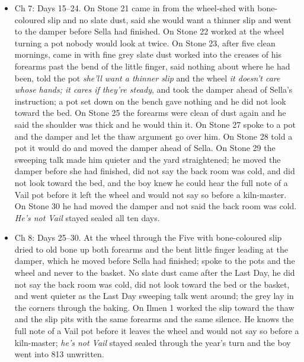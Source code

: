 \documentclass{design/chronicle}
\begin{document}
{\begin{itemize}[leftmargin=1.4em,itemsep=1pt,topsep=3pt,parsep=0pt]
\end{itemize}

\begin{itemize}[leftmargin=1.4em,itemsep=1pt,topsep=3pt,parsep=0pt]

\item Ch 7: Days 15--24. On Stone 21 came in from the wheel-shed with bone-coloured slip and no slate dust, said she would want a thinner slip and went to the damper before Sella had finished. On Stone 22 worked at the wheel turning a pot nobody would look at twice. On Stone 23, after five clean mornings, came in with fine grey slate dust worked into the creases of his forearms past the bend of the little finger, said nothing about where he had been, told the pot \emph{she’ll want a thinner slip} and the wheel \emph{it doesn’t care whose hands; it cares if they’re steady}, and took the damper ahead of Sella’s instruction; a pot set down on the bench gave nothing and he did not look toward the bed. On Stone 25 the forearms were clean of dust again and he said the shoulder was thick and he would thin it. On Stone 27 spoke to a pot and the damper and let the thaw argument go over him. On Stone 28 told a pot it would do and moved the damper ahead of Sella. On Stone 29 the sweeping talk made him quieter and the yard straightened; he moved the damper before she had finished, did not say the back room was cold, and did not look toward the bed, and the boy knew he could hear the full note of a Vail pot before it left the wheel and would not say so before a kiln-master. On Stone 30 he had moved the damper and not said the back room was cold. \emph{He’s not Vail} stayed sealed all ten days.

\end{itemize}

\begin{itemize}[leftmargin=1.4em,itemsep=1pt,topsep=3pt,parsep=0pt]

\item Ch 8: Days 25--30. At the wheel through the Five with bone-coloured slip dried to old bone up both forearms and the bent little finger leading at the damper, which he moved before Sella had finished; spoke to the pots and the wheel and never to the basket. No slate dust came after the Last Day, he did not say the back room was cold, did not look toward the bed or the basket, and went quieter as the Last Day sweeping talk went around; the grey lay in the corners through the baking. On Ilmen 1 worked the slip toward the thaw and the slip pits with the same forearms and the same silence. He knows the full note of a Vail pot before it leaves the wheel and would not say so before a kiln-master; \emph{he’s not Vail} stayed sealed through the year’s turn and the boy went into 813 unwritten.


\end{itemize}}
\end{document}
